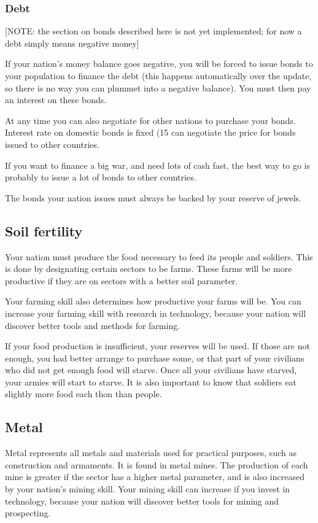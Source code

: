 \subsubsection{Debt}

[NOTE: the section on bonds described here is not yet implemented;
for now a debt simply means negative money]

If your nation's money balance goes negative, you will be forced to
issue bonds to your population to finance the debt (this happens
automatically over the update, so there is no way you can plummet into
a negative balance).  You must then pay an interest on these bonds.

At any time you can also negotiate for other nations to purchase your
bonds.  Interest rate on domestic bonds is fixed (15%
can negotiate the price for bonds issued to other countries.

If you want to finance a big war, and need lots of cash fast, the best
way to go is probably to issue a lot of bonds to other countries.

The bonds your nation issues must always be backed by your
reserve of jewels.

\subsection{Soil fertility}
Your nation must produce the food necessary to feed its people and
soldiers. This is done by designating certain sectors to be farms.
These farms will be more productive if they are on sectors with a
better soil parameter.

Your farming skill also determines how productive your farms will be.
You can increase your farming skill with research in technology, because
your nation will discover better tools and methods for farming.

If your food production is insufficient, your reserves will be used.
If those are not enough, you had better arrange to purchase some, or
that part of your civilians who did not get enough food will starve.
Once all your civilians have starved, your armies will start to
starve. It is also important to know that soldiers eat slightly more
food each thon than people.

\subsection{Metal}
Metal represents all metals and materials used for practical purposes,
such as construction and armaments.  It is found in metal mines.  The
production of each mine is greater if the sector has a higher metal
parameter, and is also increased by your nation's mining skill.  Your
mining skill can increase if you invest in technology, because your
nation will discover better tools for mining and prospecting.

